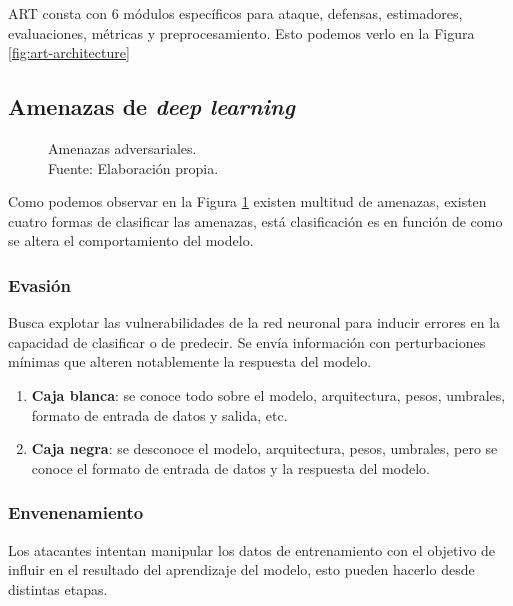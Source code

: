ART \cite{art2018} consta con 6 módulos específicos para ataque, defensas, estimadores, evaluaciones, métricas y preprocesamiento. Esto podemos verlo en la Figura \ref{fig:art-architecture}

\subsection{Amenazas de \textit{deep learning}}
\begin{figure}[H]
    \centering
    \centerline{}
    \caption{Amenazas adversariales.\\Fuente: Elaboración propia.}
    \label{fig:art-adversarial-threats}
\end{figure}

Como podemos observar en la Figura \ref{fig:art-adversarial-threats} existen multitud de amenazas, existen cuatro formas de clasificar las amenazas, está clasificación es en función de como se altera el comportamiento del modelo.

\subsubsection{Evasión}

Busca explotar las vulnerabilidades de la red neuronal para inducir errores en la capacidad de clasificar o de predecir. Se envía información con perturbaciones mínimas que alteren notablemente la respuesta del modelo.

\begin{enumerate}
    \item \textbf{Caja blanca}: se conoce todo sobre el modelo, arquitectura, pesos, umbrales, formato de entrada de datos y salida, etc. \cite{learning-machine-learning-part-3-attacking}
    \item \textbf{Caja negra}: se desconoce el modelo, arquitectura, pesos, umbrales, pero se conoce el formato de entrada de datos y la respuesta del modelo. \cite{learning-machine-learning-part-3-attacking}
\end{enumerate}

\subsubsection{Envenenamiento}

Los atacantes intentan manipular los datos de entrenamiento con el objetivo de influir en el resultado del aprendizaje del modelo, esto pueden hacerlo desde distintas etapas.

